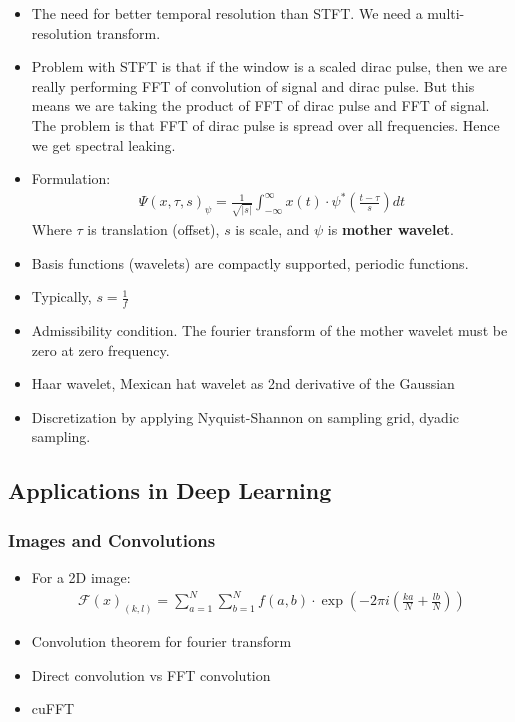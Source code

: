\documentclass[paper=a4, fontsize=12pt]{scrartcl} %
\numberwithin{equation}{section} %
\numberwithin{figure}{section} %
\numberwithin{table}{section} %
\begin{document}
\begin{itemize}
    \item The need for better temporal resolution than STFT. We need a multi-resolution transform.
    \item Problem with STFT is that if the window is a scaled dirac pulse, then we are really performing 
    FFT of convolution of signal and dirac pulse. But this means we are taking the product of FFT of dirac pulse and 
    FFT of signal. The problem is that FFT of dirac pulse is spread over all frequencies. Hence we get spectral leaking.
    \item Formulation:
    \begin{align*}
        \Psi(x, \tau, s)_\psi = \frac{1}{\sqrt{|s|}} \int_{-\infty}^{\infty} x(t) \cdot \psi^* \left( \frac{t  - \tau}{s}  \right) dt
    \end{align*}
    Where $\tau$ is translation (offset), $s$ is scale, and $\psi$ is \textbf{mother wavelet}.
    \item Basis functions (wavelets) are compactly supported, periodic functions.
    \item Typically, $\displaystyle s = \frac{1}{f}$
    \item Admissibility condition. The fourier transform of the mother wavelet must be zero at zero frequency.
    \item Haar wavelet, Mexican hat wavelet as 2nd derivative of the Gaussian
    \item Discretization by applying Nyquist-Shannon on sampling grid, dyadic sampling.
\end{itemize}

\subsection{Applications in Deep Learning}

\subsubsection{Images and Convolutions}

\begin{itemize}
    \item For a 2D image:
    \begin{align*}
        \mathcal{F}(x)_{(k, l)} = \sum_{a = 1}^N \sum_{b = 1}^N f(a, b) \cdot \exp \left( -2 \pi i \left( \frac{ka}{N} + \frac{lb}{N} \right) \right)
    \end{align*}
    \item Convolution theorem for fourier transform
    \item Direct convolution vs FFT convolution
    \item cuFFT
\end{itemize}
\end{document}
